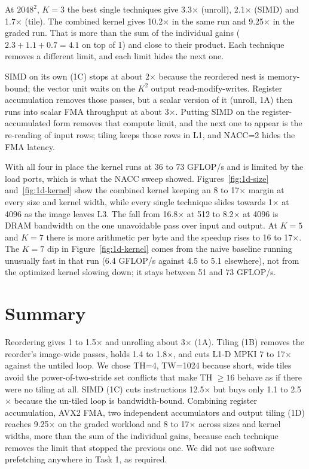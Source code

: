 \documentclass[11pt,a4paper]{article}
\begin{document}
At $2048^2$, $K=3$ the best single techniques give 3.3$\times$ (unroll), 2.1$\times$ (SIMD) and 1.7$\times$ (tile). The combined kernel gives 10.2$\times$ in the same run and 9.25$\times$ in the graded run. That is more than the sum of the individual gains ($2.3+1.1+0.7 = 4.1$ on top of 1) and close to their product. Each technique removes a different limit, and each limit hides the next one.

SIMD on its own (1C) stops at about 2$\times$ because the reordered nest is memory-bound; the vector unit waits on the $K^2$ output read-modify-writes. Register accumulation removes those passes, but a scalar version of it (unroll, 1A) then runs into scalar FMA throughput at about 3$\times$. Putting SIMD on the register-accumulated form removes that compute limit, and the next one to appear is the re-reading of input rows; tiling keeps those rows in L1, and NACC=2 hides the FMA latency.

With all four in place the kernel runs at 36 to 73 GFLOP/s and is limited by the load ports, which is what the NACC sweep showed. Figures~\ref{fig:1d-size} and~\ref{fig:1d-kernel} show the combined kernel keeping an 8 to 17$\times$ margin at every size and kernel width, while every single technique slides towards 1$\times$ at 4096 as the image leaves L3. The fall from 16.8$\times$ at 512 to 8.2$\times$ at 4096 is DRAM bandwidth on the one unavoidable pass over input and output. At $K=5$ and $K=7$ there is more arithmetic per byte and the speedup rises to 16 to 17$\times$. The $K=7$ dip in Figure~\ref{fig:1d-kernel} comes from the naive baseline running unusually fast in that run (6.4 GFLOP/s against 4.5 to 5.1 elsewhere), not from the optimized kernel slowing down; it stays between 51 and 73 GFLOP/s.

\section{Summary}

Reordering gives 1 to 1.5$\times$ and unrolling about 3$\times$ (1A). Tiling (1B) removes the reorder's image-wide passes, holds 1.4 to 1.8$\times$, and cuts L1-D MPKI 7 to 17$\times$ against the untiled loop. We chose TH=4, TW=1024 because short, wide tiles avoid the power-of-two-stride set conflicts that make TH $\ge 16$ behave as if there were no tiling at all. SIMD (1C) cuts instructions 12.5$\times$ but buys only 1.1 to 2.5$\times$ because the un-tiled loop is bandwidth-bound. Combining register accumulation, AVX2 FMA, two independent accumulators and output tiling (1D) reaches 9.25$\times$ on the graded workload and 8 to 17$\times$ across sizes and kernel widths, more than the sum of the individual gains, because each technique removes the limit that stopped the previous one. We did not use software prefetching anywhere in Task 1, as required.
\end{document}
